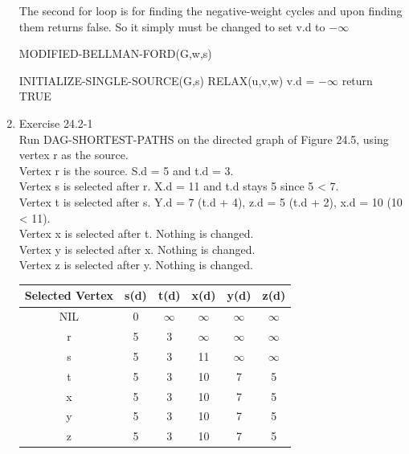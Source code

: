 \documentclass[12pt]{article}
\begin{document}
\begin{enumerate}
The second for loop is for finding the negative-weight cycles and upon finding them returns false. So it simply must be changed to set v.d to $-\infty$

MODIFIED-BELLMAN-FORD(G,w,s)
\begin{algorithmic}
    \STATE INITIALIZE-SINGLE-SOURCE(G,s)
            \STATE RELAX(u,v,w)
        \ENDFOR
    \ENDFOR
            \STATE v.d = $-\infty$
        \ENDIF
    \ENDFOR
    \STATE return TRUE
\end{algorithmic}


\item Exercise 24.2-1 \\
Run DAG-SHORTEST-PATHS on the directed graph of Figure 24.5, using vertex r as the source. \\
Vertex r is the source. S.d = 5 and t.d = 3.\\
Vertex s is selected after r. X.d = 11 and t.d stays 5 since 5 < 7. \\
Vertex t is selected after s. Y.d = 7 (t.d + 4), z.d = 5 (t.d + 2), x.d = 10 (10 < 11).\\
Vertex x is selected after t. Nothing is changed. \\
Vertex y is selected after x. Nothing is changed. \\
Vertex z is selected after y. Nothing is changed.\\
\begin{center}
 \begin{tabular}{|c|c c c c c|} 
 \hline
 Selected Vertex & s(d) & t(d) & x(d) & y(d) & z(d)\\ [0.5ex] 
 \hline
 NIL & 0 &$\infty$ &  $\infty$ & $\infty$ & $\infty$\\ 
 \hline
 r & 5 & 3 & $\infty$ & $\infty$ & $\infty$\\
 \hline
 s & 5 & 3 & 11 & $\infty$ & $\infty$ \\
 \hline
 t & 5 & 3 & 10 & 7 & 5\\
 \hline
 x & 5 & 3 & 10 & 7 & 5\\
 \hline
 y & 5 & 3 & 10 & 7 & 5\\
 \hline
 z & 5 & 3 & 10 & 7 & 5 \\
 \hline
\end{tabular}
\end{center}

\end{enumerate}
\end{document}
